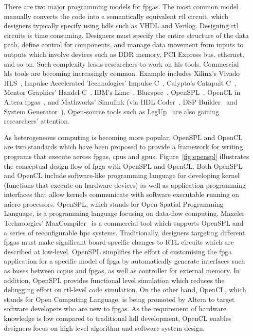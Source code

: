 There are two major programming models for \glspl{fpga}.
The most common model manually converts the code into a semantically equivalent \gls{rtl} circuit, which designers typically specify using \glspl{hdl} such as VHDL and Verilog.
Designing \gls{rtl} circuits is time consuming.
Designers must specify the entire structure of the data path, define control for components, and manage data movement from inputs to outputs which involve devices such as DDR memory, PCI Express bus, ethernet, and so on.
Such complexity leads researchers to work on \gls{hls} tools.
Commercial \gls{hls} tools are becoming increasingly common.
Example includes Xilinx's Vivado HLS~\cite{xilinxvivado}, Impulse Accelerated Technologies' Impulse C~\cite{impulsec}, Calypto's Catapult C~\cite{catapultc}, Mentor Graphics' Handel-C~\cite{handelc}, IBM's Lime~\cite{lime}, Bluespec~\cite{bluespec}, OpenSPL~\cite{openspl,maxcompiler}, OpenCL in Altera \glspl{fpga}~\cite{alteraopencl}, and Mathworks' Simulink (via HDL Coder~\cite{hdlcoder}, DSP Builder~\cite{alteradspbuilder} and System Generator~\cite{xilinxsysgen}).
Open-source tools such as LegUp~\cite{legup} are also gaining researchers' attention.

As heterogeneous computing is becoming more popular, OpenSPL and OpenCL are two standards which have been proposed to provide a framework for writing programs that execute across \glspl{fpga}, \glspl{cpu} and \glspl{gpu}.
Figure~\ref{fig:openspl} illustrates the conceptual design flow of \gls{fpga} with OpenSPL and OpenCL.
Both OpenSPL~\cite{openspl} and OpenCL include software-like programming language for developing kernel (functions that execute on hardware devices) as well as application programming interfaces that allow kernels communicate with software executable running on micro-processors.
OpenSPL, which stands for Open Spatial Programming Language, is a programming language focusing on data-flow computing.
Maxeler Technologies' MaxCompiler~\cite{maxcompiler} is a commercial tool which supports OpenSPL and a series of reconfigurable \gls{hpc} systems.
Traditionally, designers targeting different \glspl{fpga} must make significant board-specific changes to RTL circuits which are described at low-level.
OpenSPL simplifies the effort of customising the \gls{fpga} application for a specific model of \gls{fpga} by automatically generate interfaces such as buses between c\glspl{cpu} and \glspl{fpga}, as well as controller for external memory.
In addition, OpenSPL provides functional level simulation which reduces the debugging effort on \gls{rtl}-level code simulation.
On the other hand, OpenCL, which stands for Open Computing Language, is being promoted by Altera to target software developers who are new to \glspl{fpga}.
As the requirement of hardware knowledge is low compared to traditional \gls{hdl} development, OpenCL enables designers focus on high-level algorithm and software system design.

